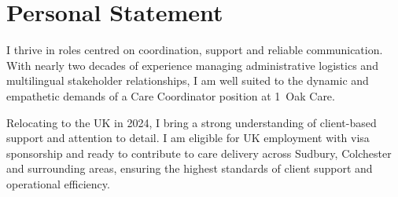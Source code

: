 \documentclass[11pt,a4paper]{article}
\begin{document}
	\section*{Personal Statement}
	I thrive in roles centred on coordination, support and reliable communication. With nearly two decades of experience managing administrative logistics and multilingual stakeholder relationships, I am well suited to the dynamic and empathetic demands of a Care Coordinator position at 1 Oak Care.
	
	Relocating to the UK in 2024, I bring a strong understanding of client-based support and attention to detail. I am eligible for UK employment with visa sponsorship and ready to contribute to care delivery across Sudbury, Colchester and surrounding areas, ensuring the highest standards of client support and operational efficiency.
	
\end{document}
